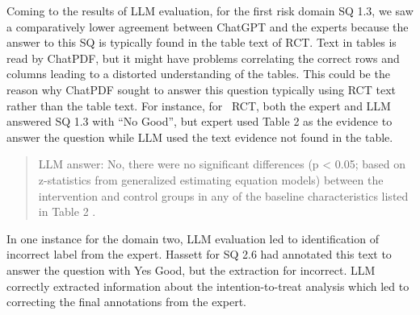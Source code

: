 \documentclass[sn-mathphys,Numbered]{sn-jnl}%
\theoremstyle{thmstyleone}%
\theoremstyle{thmstyletwo}%
\theoremstyle{thmstylethree}%
\begin{document}

Coming to the results of LLM evaluation, for the first risk domain SQ 1.3, we saw a comparatively lower agreement between ChatGPT and the experts because the answer to this SQ is typically found in the table text of RCT.
Text in tables is read by ChatPDF, but it might have problems correlating the correct rows and columns leading to a distorted understanding of the tables.
This could be the reason why ChatPDF sought to answer this question typically using RCT text rather than the table text.
For instance, for~\cite{stuck2015effect} RCT, both the expert and LLM answered SQ 1.3 with ``No Good'', but expert used Table 2 as the evidence to answer the question while LLM used the text evidence not found in the table.

\begin{quote}
    LLM answer: No, there were no significant differences (p < 0.05; based on z-statistics from generalized estimating equation models) between the intervention and control groups in any of the baseline characteristics listed in Table 2 .
\end{quote}


In one instance for the domain two, LLM evaluation led to identification of incorrect label from the expert. 
Hassett for SQ 2.6 had annotated this text to answer the question with Yes Good, but the extraction for incorrect.
LLM correctly extracted information about the intention-to-treat analysis which led to correcting the final annotations from the expert.






%
%
%
\end{document}
